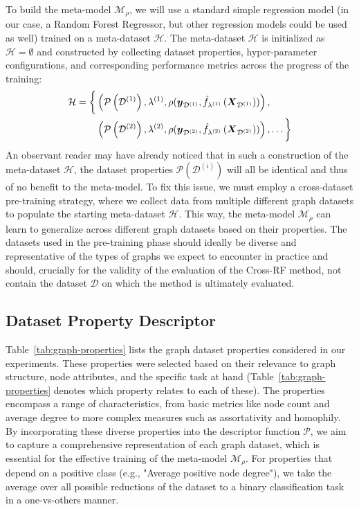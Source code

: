 To build the meta-model \( \mathcal{M}_\rho \), we will use a standard simple regression model (in our case, a Random Forest Regressor, but other regression models could be used as well) trained on a meta-dataset \( \mathcal{H} \).
The meta-dataset \( \mathcal{H} \) is initialized as \( \mathcal{H} = \emptyset \) and constructed by collecting dataset properties, hyper-parameter configurations, and corresponding performance metrics across the progress of the training:
\begin{equation*}
	\begin{split}
		\mathcal{H} = \biggl\{ &\left( \mathcal{P} \left( \mathcal{D}^{(1)} \right), \lambda^{(1)}, \rho( \boldsymbol{y}_{\mathcal{D}^{(1)}}, \hat{f}_{\lambda^{(1)}} \left( \boldsymbol{X}_{\mathcal{D}^{(1)}} \right) ) \right), \\
		&\left( \mathcal{P} \left( \mathcal{D}^{(2)} \right), \lambda^{(2)}, \rho( \boldsymbol{y}_{\mathcal{D}^{(2)}}, \hat{f}_{\lambda^{(2)}} \left( \boldsymbol{X}_{\mathcal{D}^{(2)}} \right) ) \right), \dots \biggr\}
	\end{split}
\end{equation*}
An observant reader may have already noticed that in such a construction of the meta-dataset \( \mathcal{H} \), the dataset properties \( \mathcal{P} \left( \mathcal{D}^{(i)} \right) \) will all be identical and thus of no benefit to the meta-model. To fix this issue, we must employ a cross-dataset pre-training strategy, where we collect data from multiple different graph datasets to populate the starting meta-dataset \( \mathcal{H} \). This way, the meta-model \( \mathcal{M}_\rho \) can learn to generalize across different graph datasets based on their properties. The datasets used in the pre-training phase should ideally be diverse and representative of the types of graphs we expect to encounter in practice and should, crucially for the validity of the evaluation of the Cross-RF method, not contain the dataset \( \mathcal{D} \) on which the method is ultimately evaluated.

\subsection{Dataset Property Descriptor}

Table~\ref{tab:graph-properties} lists the graph dataset properties considered in our experiments. These properties were selected based on their relevance to graph structure, node attributes, and the specific task at hand (Table~\ref{tab:graph-properties} denotes which property relates to each of these). The properties encompass a range of characteristics, from basic metrics like node count and average degree to more complex measures such as assortativity and homophily. By incorporating these diverse properties into the descriptor function \( \mathcal{P} \), we aim to capture a comprehensive representation of each graph dataset, which is essential for the effective training of the meta-model \( \mathcal{M}_\rho \). For properties that depend on a positive class (e.g., "Average positive node degree"), we take the average over all possible reductions of the dataset to a binary classification task in a one-vs-others manner.


